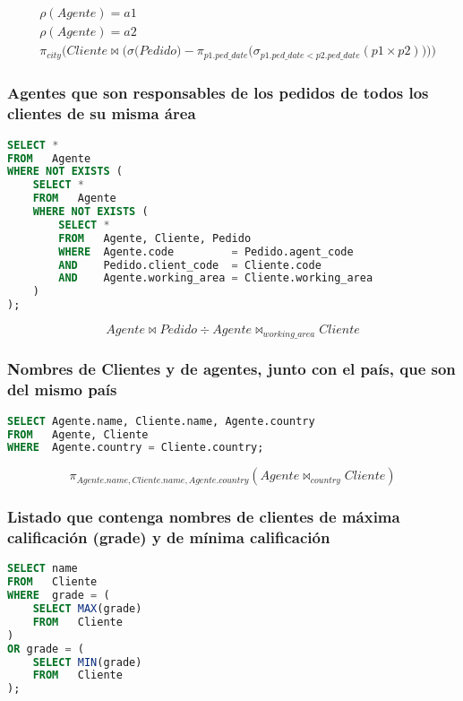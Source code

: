 \[
\begin{split}
	& \rho(Agente)=a1 \\
	& \rho(Agente)=a2 \\
	& \pi_{city}\bigg(Cliente\bowtie\Big(\sigma\big(Pedido\big)-\pi_{p1.ped\_date}\big(\sigma_{p1.ped\_date<p2.ped\_date}(p1\times p2)\big)\Big)\bigg)
\end{split}
\]

\subsubsection{Agentes que son responsables de los pedidos de todos los clientes de su misma área}

\begin{lstlisting}[language=SQL]
SELECT *
FROM   Agente
WHERE NOT EXISTS (
	SELECT *
	FROM   Agente
	WHERE NOT EXISTS (
		SELECT *
		FROM   Agente, Cliente, Pedido
		WHERE  Agente.code         = Pedido.agent_code
		AND    Pedido.client_code  = Cliente.code
		AND    Agente.working_area = Cliente.working_area
	)
);
\end{lstlisting}

\[Agente\bowtie Pedido\div Agente\bowtie_{working\_area}Cliente\]

\subsubsection{Nombres de Clientes y de agentes, junto con el país, que son del mismo país}

\begin{lstlisting}[language=SQL]
SELECT Agente.name, Cliente.name, Agente.country
FROM   Agente, Cliente
WHERE  Agente.country = Cliente.country;
\end{lstlisting}

\[\pi_{Agente.name,Cliente.name,Agente.country}(Agente\bowtie_{country}Cliente)\]

\subsubsection{Listado que contenga nombres de clientes de máxima calificación (grade) y de mínima calificación}

\begin{lstlisting}[language=SQL]
SELECT name
FROM   Cliente
WHERE  grade = (
	SELECT MAX(grade)
	FROM   Cliente
)
OR grade = (
	SELECT MIN(grade)
	FROM   Cliente
);
\end{lstlisting}


